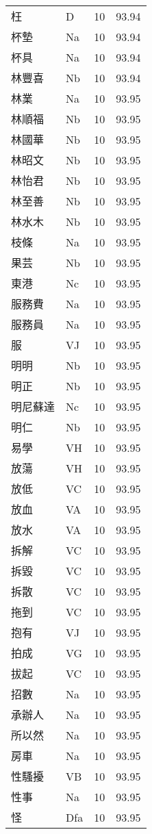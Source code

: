\documentclass[twocolumn]{book}
\begin{document}
\begin{supertabular}{llrr}
枉 & D & 10 &  93.94\\
杯墊 & Na & 10 &  93.94\\
杯具 & Na & 10 &  93.94\\
林豐喜 & Nb & 10 &  93.94\\
林業 & Na & 10 &  93.95\\
林順福 & Nb & 10 &  93.95\\
林國華 & Nb & 10 &  93.95\\
林昭文 & Nb & 10 &  93.95\\
林怡君 & Nb & 10 &  93.95\\
林至善 & Nb & 10 &  93.95\\
林水木 & Nb & 10 &  93.95\\
枝條 & Na & 10 &  93.95\\
果芸 & Nb & 10 &  93.95\\
東港 & Nc & 10 &  93.95\\
服務費 & Na & 10 &  93.95\\
服務員 & Na & 10 &  93.95\\
服 & VJ & 10 &  93.95\\
明明 & Nb & 10 &  93.95\\
明正 & Nb & 10 &  93.95\\
明尼蘇達 & Nc & 10 &  93.95\\
明仁 & Nb & 10 &  93.95\\
易學 & VH & 10 &  93.95\\
放蕩 & VH & 10 &  93.95\\
放低 & VC & 10 &  93.95\\
放血 & VA & 10 &  93.95\\
放水 & VA & 10 &  93.95\\
拆解 & VC & 10 &  93.95\\
拆毀 & VC & 10 &  93.95\\
拆散 & VC & 10 &  93.95\\
拖到 & VC & 10 &  93.95\\
抱有 & VJ & 10 &  93.95\\
拍成 & VG & 10 &  93.95\\
拔起 & VC & 10 &  93.95\\
招數 & Na & 10 &  93.95\\
承辦人 & Na & 10 &  93.95\\
所以然 & Na & 10 &  93.95\\
房車 & Na & 10 &  93.95\\
性騷擾 & VB & 10 &  93.95\\
性事 & Na & 10 &  93.95\\
怪 & Dfa & 10 &  93.95\\

\end{supertabular}
\end{document}
